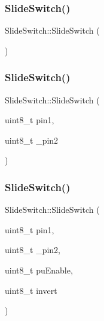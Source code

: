 \subsubsection{\texorpdfstring{Slide\+Switch()}{SlideSwitch()}\hspace{0.1cm}{\footnotesize\ttfamily [1/3]}}
{\footnotesize\ttfamily Slide\+Switch\+::\+Slide\+Switch (\begin{DoxyParamCaption}{ }\end{DoxyParamCaption})}

\mbox{\label{class_slide_switch_a00c9284ec86c53602afd988faacb02a6}} 
\subsubsection{\texorpdfstring{Slide\+Switch()}{SlideSwitch()}\hspace{0.1cm}{\footnotesize\ttfamily [2/3]}}
{\footnotesize\ttfamily Slide\+Switch\+::\+Slide\+Switch (\begin{DoxyParamCaption}\item[{uint8\+\_\+t}]{pin1,  }\item[{uint8\+\_\+t}]{\+\_\+pin2 }\end{DoxyParamCaption})}

\mbox{\label{class_slide_switch_a0806b870d5fb6bfb22b82b6f0146795e}} 
\subsubsection{\texorpdfstring{Slide\+Switch()}{SlideSwitch()}\hspace{0.1cm}{\footnotesize\ttfamily [3/3]}}
{\footnotesize\ttfamily Slide\+Switch\+::\+Slide\+Switch (\begin{DoxyParamCaption}\item[{uint8\+\_\+t}]{pin1,  }\item[{uint8\+\_\+t}]{\+\_\+pin2,  }\item[{uint8\+\_\+t}]{pu\+Enable,  }\item[{uint8\+\_\+t}]{invert }\end{DoxyParamCaption})}



